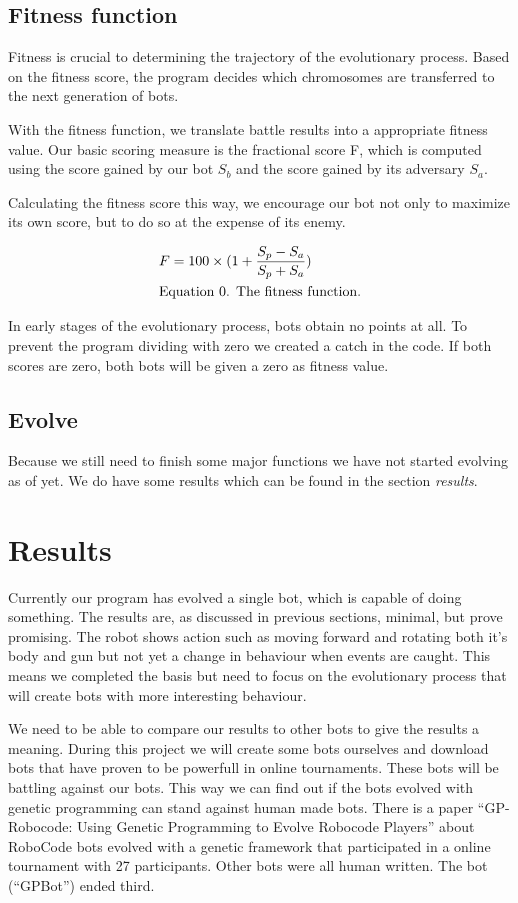 \documentclass[a4paper,10pt]{article}
\begin{document}
\subsection{Fitness function}
Fitness is crucial to determining the trajectory of the evolutionary process. Based on the fitness score, the program decides which chromosomes are transferred to the next generation of bots.

With the fitness function, we translate battle results into a appropriate fitness value. Our basic scoring measure is the fractional score F, which is computed using the score gained by our bot $S_b$ and the score gained by its adversary $S_a$.

Calculating the fitness score this way, we encourage our bot not only to maximize its own score, but to do so at the expense of its enemy.

\begin{eqnarray*}
	& F = 100 \times (1 + \frac{S_p - S_a}{S_p + S_a})\\
	& \mbox{Equation \theequation\addtocounter{equation}{1}. The fitness function.}
\end{eqnarray*}

In early stages of the evolutionary process, bots obtain no points at all. To prevent the program dividing with zero we created a catch in the code. If both scores are zero, both bots will be given a zero as fitness value.

\subsection{Evolve}
Because we still need to finish some major functions we have not started evolving as of yet. We do have some results which can be found in the section \textit{results}. 

\section{Results}
Currently our program has evolved a single bot, which is capable of doing something. The results are, as discussed in previous sections, minimal, but prove promising. The robot shows action such as moving forward and rotating both it's body and gun but not yet a change in behaviour when events are caught. This means we completed the basis but need to focus on the evolutionary process that will create bots with more interesting behaviour.

We need to be able to compare our results to other bots to give the results a meaning. During this project we will create some bots ourselves and download bots that have proven to be powerfull in online tournaments. These bots will be battling against our bots. This way we can find out if the bots evolved with genetic programming can stand against human made bots. There is a paper ``GP-Robocode: Using Genetic Programming to Evolve Robocode Players'' \cite{shichel} about RoboCode bots evolved with a genetic framework that participated in a online tournament with 27 participants. Other bots were all human written. The bot (``GPBot'') ended third.
\end{document}

